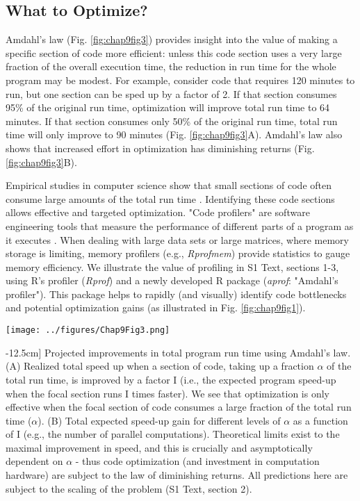 \documentclass[b5paper,justified]{tufte-book} %
\begin{document}
\begin{fullwidth}
\section{What to Optimize?}
Amdahl's law (Fig. \ref{fig:chap9fig3}) \citep{Amdahl1967} provides insight into the value of making a specific section of code more efficient: unless this code section uses a very large fraction of the overall execution time,
the reduction in run time for the whole program may be modest. For example, consider code that requires 120 minutes to run, but one section can be sped up by a factor of 2. If that section consumes 95\% of the original run time, optimization will improve total run time to 64 minutes. If that section consumes only 50\% of the original run time, total run time will only improve to 90 minutes (Fig. \ref{fig:chap9fig3}A). Amdahl's law also shows that increased effort in optimization has diminishing returns (Fig. \ref{fig:chap9fig3}B).

Empirical studies in computer science show that small sections of code often consume large amounts of the total run time \citep{Porter1990}. Identifying these code sections allows effective and targeted optimization. "Code profilers" are software engineering tools that measure the performance of different parts of a program as it executes \citep{Bryant2010}. When dealing with large data sets or large matrices, where memory storage is limiting, memory profilers (e.g., \textit{Rprofmem}) provide statistics to gauge memory efficiency. We illustrate the value of profiling in S1 Text, sections 1-3, using R's profiler (\textit{Rprof}) and a newly developed R package (\textit{aprof}: "Amdahl's profiler"). This package helps to rapidly (and visually) identify code bottlenecks and potential optimization gains (as illustrated in Fig. \ref{fig:chap9fig1}).


\begin{figure*}
\hspace*{.5cm} \texttt{[image: ../figures/Chap9Fig3.png]}
\caption[Projected improvements in total program run time using Amdahl's law.][-12.5cm]{
Projected improvements in total program run time using Amdahl's law. (A) Realized total speed up when a section of code, taking up a fraction $\alpha$ of the total run time, is improved by a factor I (i.e., the expected program speed-up when the focal section runs I times faster). We see that optimization is only effective when the focal section of code consumes a large fraction of the total run time ($\alpha$). (B) Total expected speed-up gain for different levels of $\alpha$ as a function of I (e.g., the number of parallel computations). Theoretical limits exist to the maximal improvement in speed, and this is crucially and asymptotically dependent on $\alpha$ - thus code optimization (and investment in computation hardware) are subject to the law of diminishing returns. All predictions here are subject to the scaling of the problem (S1 Text, section 2).}\label{fig:chap9fig3}
\end{figure*}



\end{fullwidth}
\end{document}
